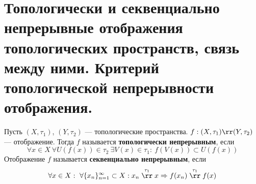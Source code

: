 \newpage
\section{Топологически и секвенциально непрерывные отображения топологических пространств, связь между ними. Критерий топологической непрерывности отображения.}

\begin{definition}
	Пусть $(X, \tau_1)$, $(Y, \tau_2)$ --- топологические пространства. $f: (X,\tau_1) \rr (Y, \tau_2)$ --- отображение. Тогда $f$ называется \textbf{топологически непрерывным}, если 
	$$
	\forall x \in X \ \forall U(f(x)) \in \tau_2 \ \exists V(x) \in \tau_1: \ f(V(x)) \subset U(f(x))
	$$
	Отображение $f$ называется \textbf{секвенциально непрерывным}, если
	$$
	\forall x \in X: \ \forall \{x_n\}_{n=1}^{\infty} \subset X: x_n \stackrel{\tau_1}{\rr} x \Rightarrow f(x_n) \stackrel{\tau_1}{\rr} f(x)
	$$
\end{definition}

